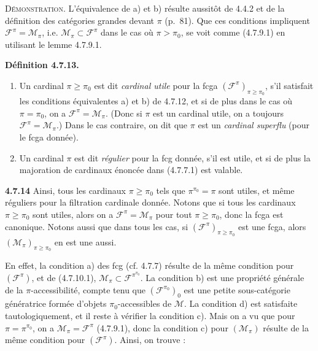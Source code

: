 \documentclass[11pt]{article}
\newcommand{\msp}[1]{\marginpar{\footnotesize [#1]}}
\begin{document}
\textsc{Démonstration}. L'équivalence de a) et b) résulte aussitôt de 4.4.2 et de la définition des catégories grandes devant $\pi$ (p.~81). Que ces
\msp{page 179}
conditions impliquent $\mathcal{F}^{\pi}=\mathcal{M}_\pi$, i.e. $\mathcal{M}_\pi\subset\mathcal{F}^{\pi}$ dans le cas où $\pi>\pi_0$, se voit comme (4.7.9.1) en utilisant le lemme 4.7.9.1.

\textbf{Définition 4.7.13.}
\begin{enumerate}[label={$\arabic*^{\circ}$)}]
\item Un cardinal $\pi\geqslant\pi_0$ est dit \textit{cardinal utile} pour la fcga $(\mathcal{F}^{\pi})_{\pi\geqslant\pi_0}$, s'il satisfait les conditions équivalentes a) et b) de 4.7.12, et si de plus dans le cas où $\pi=\pi_0$, on a $\mathcal{F}^{\pi}=\mathcal{M}_\pi$. (Donc si $\pi$ est un cardinal utile, on a toujours $\mathcal{F}^{\pi}=\mathcal{M}_\pi$.) Dans le cas contraire, on dit que $\pi$ est un \textit{cardinal superflu} (pour le fcga donnée). %
\item Un cardinal $\pi$ est dit \textit{régulier} pour la fcg donnée, s'il est utile, et si de plus la majoration de cardinaux énoncée dans (4.7.7.1) est valable.
\end{enumerate}

\textbf{4.7.14} Ainsi, tous les cardinaux $\pi\geqslant\pi_0$ tels que $\pi^{\pi_0}=\pi$ sont utiles, et même réguliers pour la filtration cardinale donnée. Notons que si tous les cardinaux $\pi\geqslant\pi_0$ sont utiles, alors on a $\mathcal{F}^{\pi}=\mathcal{M}_\pi$ pour tout $\pi\geqslant\pi_0$, donc la fcga est canonique. Notons aussi que dans tous les cas, si $(\mathcal{F}^{\pi})_{\pi\geqslant\pi_0}$ est une fcga, alors $(\mathcal{M}_\pi)_{\pi\geqslant\pi_0}$ en est une aussi.

\noindent\msp{page 180}En effet, la condition a) des fcg (cf. 4.7.7) résulte de la même condition pour $(\mathcal{F}^{\pi})$, et de (4.7.10.1), $\mathcal{M}_\pi\subset\mathcal{F}^{\pi^{\pi_0}}$. La condition b) est une propriété générale de la $\pi$-accessibilité, compte tenu que $(\mathcal{F}^{\pi_0})_0$ est une petite sous-catégorie génératrice formée d'objets $\pi_0$-accessibles de $\mathcal{M}$. La condition d) est satisfaite tautologiquement, et il reste à vérifier la condition c). Mais on a vu que pour $\pi=\pi^{\pi_0}$, on a $\mathcal{M}_\pi=\mathcal{F}^{\pi}$ (4.7.9.1), donc la condition c) pour $(\mathcal{M}_\pi)$ résulte de la même condition pour $(\mathcal{F}^{\pi})$. Ainsi, on trouve :
\end{document}
